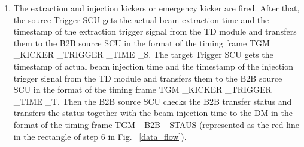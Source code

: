 \begin{enumerate}
\item  The extraction and injection kickers or emergency kicker are fired. After that, the source Trigger SCU gets the actual beam extraction time and the timestamp of the extraction trigger signal from the TD module and transfers them to the B2B source SCU in the format of the timing frame TGM \_KICKER \_TRIGGER \_TIME \_S. The target Trigger SCU gets the timestamp of actual beam injection time and the timestamp of the injection trigger signal from the TD module and transfers them to the B2B source SCU in the format of the timing frame TGM \_KICKER \_TRIGGER \_TIME \_T. Then the B2B source SCU checks the B2B transfer status and transfers the status together with the beam injection time to the DM in the format of the timing frame TGM \_B2B \_STAUS (represented as the red line in the rectangle of step 6 in Fig. ~\ref{data_flow}).

\end{enumerate}


